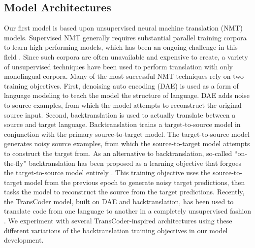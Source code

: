 \documentclass[conference]{IEEEtran}
\begin{document}
\subsection{Model Architectures}
\label{sec:Proposal:Model}

Our first model is based upon unsupervised neural machine translation (NMT) models. Supervised NMT generally requires substantial parallel training corpora to learn high-performing models, which has been an ongoing challenge in this field \cite{guzman2019flores}. Since such corpora are often unavailable and expensive to create, a variety of unsupervised techniques have been used to perform translation with only monolingual corpora. Many of the most successful NMT techniques rely on two training objectives. First, denoising auto encoding (DAE) \cite{vincent2010stacked} is used as a form of language modeling to teach the model the structure of language. DAE adds noise to source examples, from which the model attempts to reconstruct the original source input. Second, backtranslation \cite{sennrich2015improving} is used to actually translate between a source and target language. Backtranslation trains a target-to-source model in conjunction with the primary source-to-target model. The target-to-source model generates noisy source examples, from which the source-to-target model attempts to construct the target from. As an alternative to backtranslation, so-called ``on-the-fly'' backtranslation has been proposed as a learning objective that forgoes the target-to-source model entirely \cite{lample2017unsupervised, artetxe2017unsupervised}. This training objective uses the source-to-target model from the previous epoch to generate noisy target predictions, then tasks the model to reconstruct the source from the target predictions. Recently, the TransCoder model, built on DAE and backtranslation, has been used to translate code from one language to another in a completely unsupervised fashion \cite{roziere2020unsupervised, roziere2021dobf, roziere2021leveraging}. We experiment with several TransCoder-inspired architectures using these different variations of the backtranslation training objectives in our model development. 
\end{document}
